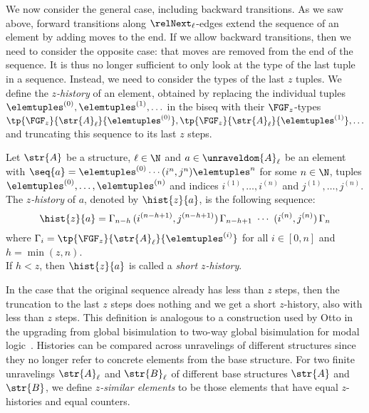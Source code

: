 We now consider the general case, including backward transitions.
As we saw above, forward transitions along $\relNext_{\ell}$-edges extend the sequence of an element by adding moves to the end.
If we allow backward transitions, then we need to consider the opposite case: that moves are removed from the end of the sequence.
It is thus no longer sufficient to only look at the type of the last tuple in a sequence.
Instead, we need to consider the types of the last $z$ tuples.
We define the \emph{$z$-history} of an element, obtained by replacing the individual tuples $\elemtuples^{(0)}, \elemtuples^{(1)}, \ldots$ in the biseq with their $\FGF_{z}$-types $\tp{\FGF_{z}}{\str{A}_{\ell}}{\elemtuples^{(0)}}, \tp{\FGF_{z}}{\str{A}_{\ell}}{\elemtuples^{(1)}}, \ldots$ and truncating this sequence to its last $z$ steps.
\begin{definition}[$z$-history]
  Let $\str{A}$ be a structure, $\ell \in \N$ and $a \in \unraveldom{A}_{\ell}$ be an element with $\seq{a} = \elemtuples^{(0)} \cdots (i^{n}, j^{n})\elemtuples^{n}$ for some $n \in \N$, tuples $\elemtuples^{(0)}, \ldots, \elemtuples^{(n)}$ and indices $i^{(1)}, \ldots, i^{(n)}$ and $j^{(1)}, \ldots, j^{(n)}$.\\
  The \emph{$z$-history} of $a$, denoted by $\hist{z}{a}$, is the following sequence:
  \begin{equation*}
    \hist{z}{a} =
      \Gamma_{n-h}
      \,
      (i^{(n-h+1)}, j^{(n-h+1)})
      \,
      \Gamma_{n-h+1}
      \
      \cdots
      \
      (i^{(n)}, j^{(n)})
      \,
      \Gamma_{n}
  \end{equation*}
  where $\Gamma_{i} = \tp{\FGF_{z}}{\str{A}_{\ell}}{\elemtuples^{(i)}}$ for all $i \in [0,n]$ and $h = \min(z, n)$. \\[0.5ex]
  If $h < z$, then $\hist{z}{a}$ is called a \emph{short $z$-history}.
\end{definition}
In the case that the original sequence already has less than $z$ steps, then the truncation to the last $z$ steps does nothing and we get a short $z$-history, also with less than $z$ steps.
This definition is analogous to a construction used by Otto in the upgrading from global bisimulation to two-way global bisimulation for modal logic~\cite[Def. 39]{Otto04}.
Histories can be compared across unravelings of different structures since they no longer refer to concrete elements from the base structure.
For two finite unravelings $\str{A}_{\ell}$ and $\str{B}_{\ell}$ of different base structures $\str{A}$ and $\str{B}$, we define \emph{$z$-similar elements} to be those elements that have equal $z$-histories and equal counters.
